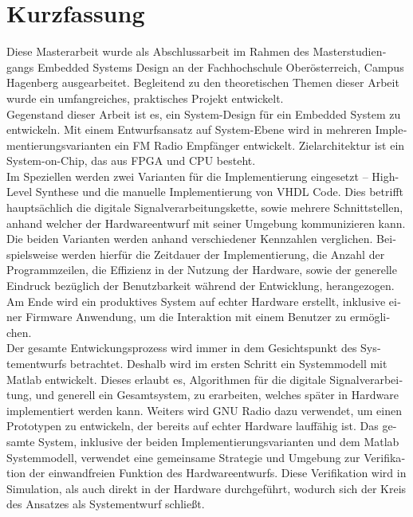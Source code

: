 \chapter{Kurzfassung}

\begin{german}

Diese Masterarbeit wurde als Abschlussarbeit im Rahmen des Masterstudiengangs Embedded Systems Design an der Fachhochschule Oberösterreich, Campus Hagenberg ausgearbeitet.
Begleitend zu den theoretischen Themen dieser Arbeit wurde ein umfangreiches, praktisches Projekt entwickelt.\\

Gegenstand dieser Arbeit ist es, ein System-Design für ein Embedded System zu entwickeln.
Mit einem Entwurfsansatz auf System-Ebene wird in mehreren Implementierungsvarianten ein FM Radio Empfänger entwickelt.
Zielarchitektur ist ein System-on-Chip, das aus FPGA und CPU besteht.\\

Im Speziellen werden zwei Varianten für die Implementierung eingesetzt -- High-Level Synthese und die manuelle Implementierung von VHDL Code.
Dies betrifft hauptsächlich die digitale Signalverarbeitungskette, sowie mehrere Schnittstellen, anhand welcher der Hardwareentwurf mit seiner Umgebung kommunizieren kann.
Die beiden Varianten werden anhand verschiedener Kennzahlen verglichen.
Beispielsweise werden hierfür die Zeitdauer der Implementierung, die Anzahl der Programmzeilen, die Effizienz in der Nutzung der Hardware, sowie der generelle Eindruck bezüglich der Benutzbarkeit während der Entwicklung, herangezogen.
Am Ende wird ein produktives System auf echter Hardware erstellt, inklusive einer Firmware Anwendung, um die Interaktion mit einem Benutzer zu ermöglichen.\\

Der gesamte Entwickungsprozess wird immer in dem Gesichtspunkt des Systementwurfs betrachtet.
Deshalb wird im ersten Schritt ein Systemmodell mit Matlab entwickelt.
Dieses erlaubt es, Algorithmen für die digitale Signalverarbeitung, und generell ein Gesamtsystem, zu erarbeiten, welches später in Hardware implementiert werden kann.
Weiters wird GNU Radio dazu verwendet, um einen Prototypen zu entwickeln, der bereits auf echter Hardware lauffähig ist.
Das gesamte System, inklusive der beiden Implementierungsvarianten und dem Matlab Systemmodell, verwendet eine gemeinsame Strategie und Umgebung zur Verifikation der einwandfreien Funktion des Hardwareentwurfs.
Diese Verifikation wird in Simulation, als auch direkt in der Hardware durchgeführt, wodurch sich der Kreis des Ansatzes als Systementwurf schließt.

\end{german}
